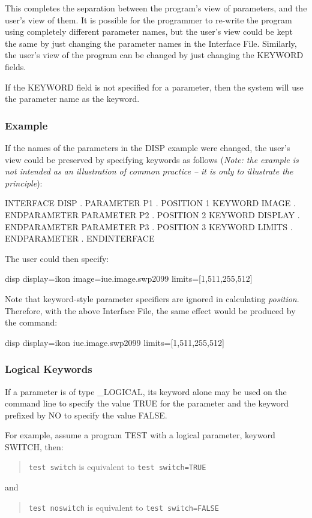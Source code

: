 \documentclass[twoside,11pt,nolof]{starlink}
\begin{document}
This completes the separation between the program's
view of parameters, and the user's view of them. It is possible for the
programmer to re-write the program using completely different parameter
names, but the user's view could be kept the same by just changing the
parameter names in the Interface File. Similarly, the
user's view of the program can be changed by just changing the
KEYWORD fields.

If the KEYWORD field is not specified for a parameter, then the system will
use the parameter name as the keyword.

\subsubsection*{Example}
If the names of the parameters in the DISP example were changed,
the user's view could be preserved by specifying keywords as follows
(\emph{Note: the example is not intended as an
illustration of common practice -- it is only to illustrate the
principle}\/):
\begin{terminalv}
INTERFACE DISP
   .
   PARAMETER P1
         .
      POSITION 1
      KEYWORD IMAGE
         .
   ENDPARAMETER
   PARAMETER P2
         .
      POSITION 2
      KEYWORD DISPLAY
         .
   ENDPARAMETER
   PARAMETER P3
         .
      POSITION 3
      KEYWORD LIMITS
         .
   ENDPARAMETER
      .
ENDINTERFACE
\end{terminalv}
The user could then specify:
\begin{terminalv}
disp display=ikon image=iue.image.swp2099 limits=[1,511,255,512]
\end{terminalv}
Note that keyword-style parameter specifiers are ignored in calculating
\emph{position}.
Therefore, with the above Interface File, the same effect would be produced
by the command:
\begin{terminalv}
disp display=ikon iue.image.swp2099 limits=[1,511,255,512]
\end{terminalv}

\subsubsection*{Logical Keywords}
If a parameter is of type \_LOGICAL, its keyword alone may be used on
the command line to specify the value TRUE for the parameter and the
keyword prefixed by NO to specify the value FALSE.

For example, assume a program TEST with a logical parameter, keyword
SWITCH, then:
\begin{quote}
\texttt{test switch} is equivalent to \texttt{test switch=TRUE}
\end{quote}
and
\begin{quote}
\texttt{test noswitch} is equivalent to \texttt{test switch=FALSE}
\end{quote}
\end{document}
